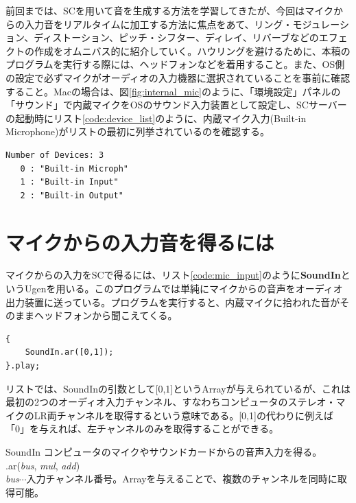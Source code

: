 \documentclass{jsarticle}
\begin{document}
\begin{figure}

\end{figure}
前回までは、SCを用いて音を生成する方法を学習してきたが、今回はマイクからの入力音をリアルタイムに加工する方法に焦点をあて、リング・モジュレーション、ディストーション、ピッチ・シフター、ディレイ、リバーブなどのエフェクトの作成をオムニバス的に紹介していく。ハウリングを避けるために、本稿のプログラムを実行する際には、ヘッドフォンなどを着用すること。また、OS側の設定で必ずマイクがオーディオの入力機器に選択されていることを事前に確認すること。Macの場合は、図\ref{fig:internal_mic}のように、「環境設定」パネルの「サウンド」で内蔵マイクをOSのサウンド入力装置として設定し、SCサーバーの起動時にリスト\ref{code:device_list}のように、内蔵マイク入力(Built-in Microphone)がリストの最初に列挙されているのを確認する。

\begin{lstlisting}[caption=入出力デバイスのリスト,label=code:device_list]
Number of Devices: 3
   0 : "Built-in Microph"
   1 : "Built-in Input"
   2 : "Built-in Output"
\end{lstlisting}

\section{マイクからの入力音を得るには}
マイクからの入力をSCで得るには、リスト\ref{code:mic_input}のように{\bf SoundIn}というUgenを用いる。このプログラムでは単純にマイクからの音声をオーディオ出力装置に送っている。プログラムを実行すると、内蔵マイクに拾われた音がそのままヘッドフォンから聞こえてくる。

\begin{lstlisting}[caption=マイク入力,label=code:mic_input]
{
	SoundIn.ar([0,1]);
}.play;
\end{lstlisting}

リストでは、SoundInの引数として[0,1]というArrayが与えられているが、これは最初の2つのオーディオ入力チャンネル、すなわちコンピュータのステレオ・マイクのLR両チャンネルを取得するという意味である。[0,1]の代わりに例えば「0」を与えれば、左チャンネルのみを取得することができる。

\begin{itembox}[l]{SoundIn}
{\footnotesize 
コンピュータのマイクやサウンドカードからの音声入力を得る。\\
.ar({\it bus}, {\it mul}, {\it add})\\
{\it bus}$\cdots$入力チャンネル番号。Arrayを与えることで、複数のチャンネルを同時に取得可能。\\
}
\end{itembox}
\end{document}
